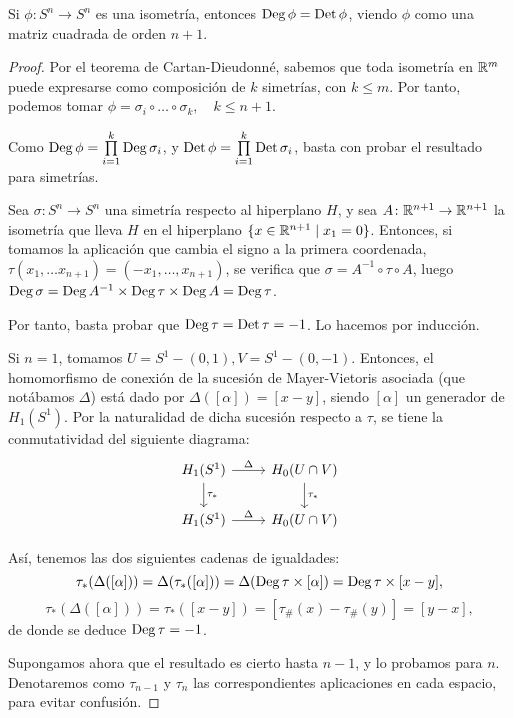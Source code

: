 \begin{lemma}
  Si $\phi \colon S^n \to S^n$ es una isometría, entonces $\operatorname{Deg} \phi = \operatorname{Det} \phi$, viendo $\phi$ como una matriz cuadrada
  de orden $n+1$.
\end{lemma}

\begin{proof}
  Por el teorema de Cartan-Dieudonné, sabemos que toda isometría en $\mathbb{R}^m$ puede expresarse como composición de
  $k$ simetrías, con $k \leq m$. Por tanto, podemos tomar $\phi = \sigma_i \circ \dots \circ \sigma_k, \quad k \leq n+1$.

  Como $\operatorname{Deg} \phi = \prod\limits_{i = 1}^k \operatorname{Deg} \sigma_i$, y $\operatorname{Det} \phi = \prod\limits_{i = 1}^k \operatorname{Det} \sigma_i$,
  basta con probar el resultado para simetrías.

  Sea $\sigma \colon S^n \to S^n$ una simetría respecto al hiperplano $H$, y sea $A \colon \mathbb{R}^{n+1} \to \mathbb{R}^{n+1}$ la isometría
  que lleva $H$ en el hiperplano $\{x \in \mathbb{R}^{n+1} \mid x_1 = 0\}$. Entonces, si tomamos la aplicación que cambia el signo a la primera
  coordenada, $\tau(x_1, \dots x_{n+1}) = (-x_1, \dots, x_{n+1})$, se verifica que $\sigma = A^{-1} \circ \tau \circ A$, luego
  $\operatorname{Deg} \sigma = \operatorname{Deg} A^{-1} \times \operatorname{Deg} \tau \times \operatorname{Deg} A = \operatorname{Deg} \tau$.

  Por tanto, basta probar que $\operatorname{Deg} \tau = \operatorname{Det} \tau = -1$. Lo hacemos por inducción.

  Si $n = 1$, tomamos $U = S^1 - (0, 1), V = S^1 - (0, -1)$. Entonces, el homomorfismo de conexión de la sucesión
  de Mayer-Vietoris asociada (que notábamos $\Delta$) está dado por $\Delta([\alpha]) = [x-y]$, siendo $[\alpha]$ un generador de $H_1(S^1)$.
  Por la naturalidad de dicha sucesión respecto a $\tau$, se tiene la conmutatividad del siguiente diagrama:
  \[ \begin{tikzcd}
    H_1(S^1) \arrow{r}{\Delta} \arrow{d}{\tau_*} & H_0(U \cap V) \arrow{d}{\tau_*} \\
    H_1(S^1) \arrow{r}{\Delta} & H_0(U \cap V)
  \end{tikzcd} \]

  Así, tenemos las dos siguientes cadenas de igualdades:
  \[\tau_*(\Delta([\alpha])) = \Delta(\tau_*([\alpha])) = \Delta(\operatorname{Deg} \tau \times [\alpha]) = \operatorname{Deg} \tau \times [x-y],\]
  \[\tau_*(\Delta([\alpha])) = \tau_*([x-y]) = [\tau_\#(x) - \tau_\#(y)] = [y - x], \]
  de donde se deduce $\operatorname{Deg} \tau = -1$.

  Supongamos ahora que el resultado es cierto hasta $n-1$, y lo probamos para $n$. Denotaremos como $\tau_{n-1}$ y $\tau_{n}$
  las correspondientes aplicaciones en cada espacio, para evitar confusión.


\end{proof}

